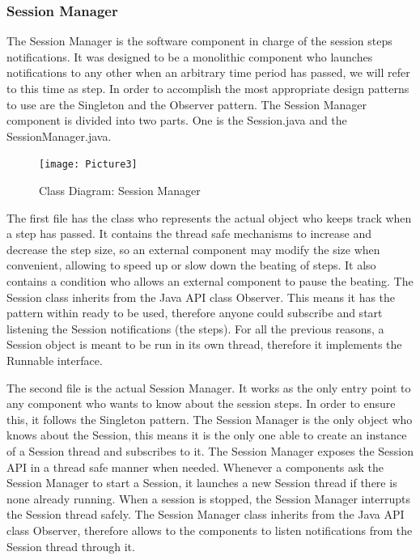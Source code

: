 \documentclass[11pt]{article}
\begin{document}
{\begin{itemize}
\subsubsection{Session Manager}
The Session Manager is the software component in charge of the session steps notifications. 
It was designed to be a monolithic component who launches notifications to any other when an arbitrary time period has passed, we will refer to this time as step. In order to accomplish the most appropriate design patterns to use are the Singleton and the Observer pattern.
The Session Manager component is divided into two parts. One is the Session.java and the SessionManager.java.

\begin{figure}[h]
        \texttt{[image: Picture3]} 
        \centering
        \caption{Class Diagram: Session Manager}
        \label{cdsm}
\end{figure}

The first file has the class who represents the actual object who keeps track when a step has passed. It contains the thread safe mechanisms to increase and decrease the step size, so an external component may modify the size when convenient, allowing to speed up or slow down the beating of steps. It also contains a condition who allows an external component to pause the beating. The Session class inherits from the Java API class Observer. This means it has the pattern within ready to be used, therefore anyone could subscribe and start listening the Session notifications (the steps). For all the previous reasons, a Session object is meant to be run in its own thread, therefore it implements the Runnable interface.

The second file is the actual Session Manager. It works as the only entry point to any component who wants to know about the session steps. In order to ensure this, it follows the Singleton pattern. The Session Manager is the only object who knows about the Session, this means it is the only one able to create an instance of a Session thread and subscribes to it. The Session Manager exposes the Session API in a thread safe manner when needed. Whenever a components ask the Session Manager to start a Session, it launches a new Session thread if there is none already running. When a session is stopped, the Session Manager interrupts the Session thread safely. The Session Manager class inherits from the Java API class Observer, therefore allows to the components to listen notifications from the Session thread through it.


\end{itemize}}
\end{document}
